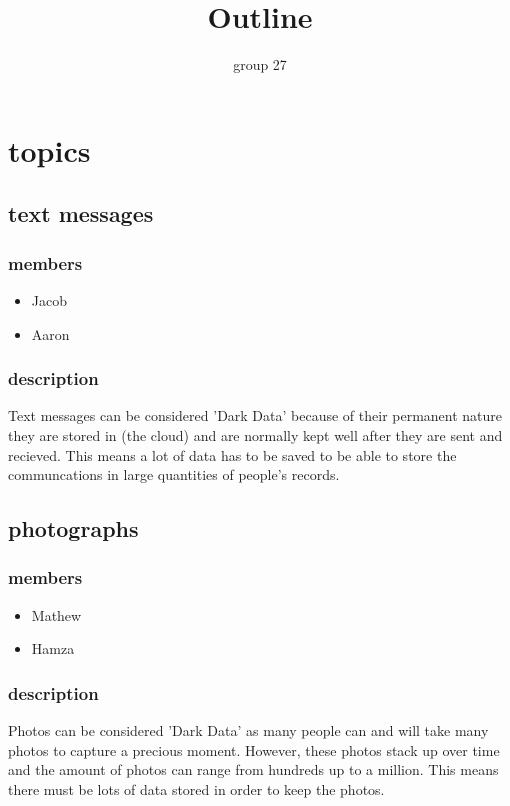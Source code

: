 \documentclass{article}
\begin{document}
\title{Outline}
\author{group 27}

\maketitle
\newpage


\section{topics}
\subsection{text messages} 
\subsubsection{members}
\begin{itemize}
    \item Jacob
    \item Aaron
\end{itemize}
\subsubsection{description}
 Text messages can be considered 'Dark Data' because of their permanent nature they are stored in (the cloud) and 
 are normally kept well after they are sent and recieved. This means a lot of data has to be saved to be able to
 store the communcations in large quantities of people's records. 

\subsection{photographs}
\subsubsection{members}
\begin{itemize}
    \item Mathew
    \item Hamza
\end{itemize}
\subsubsection{description}
Photos can be considered 'Dark Data' as many people can and will take many photos to capture a precious moment. However, these photos stack up over time and the amount of photos can range from hundreds up to a million. This means there must be lots of data stored in order to keep the photos.
\end{document}
